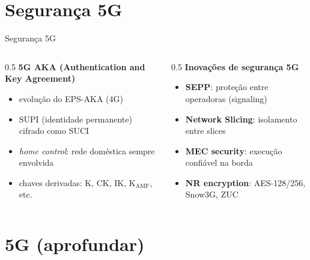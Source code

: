 \documentclass[aspectratio=169,11pt]{beamer}
\begin{document}
\section{Segurança 5G}

\begin{frame}{Segurança 5G}
  \begin{columns}
    \begin{column}{0.5\textwidth}
      \textbf{5G AKA (Authentication and Key Agreement)}
      \begin{itemize}
        \item evolução do EPS-AKA (4G)
        \item SUPI (identidade permanente) cifrado como SUCI
        \item \emph{home control}: rede doméstica sempre envolvida
        \item chaves derivadas: K, CK, IK, K$_{\text{AMF}}$, etc.
      \end{itemize}
    \end{column}
    \begin{column}{0.5\textwidth}
      \textbf{Inovações de segurança 5G}
      \begin{itemize}
        \item \textbf{SEPP}: proteção entre operadoras (signaling)
        \item \textbf{Network Slicing}: isolamento entre slices
        \item \textbf{MEC security}: execução confiável na borda
        \item \textbf{NR encryption}: AES-128/256, Snow3G, ZUC
      \end{itemize}
    \end{column}
  \end{columns}
\end{frame}

\section{5G (aprofundar)}
\end{document}

